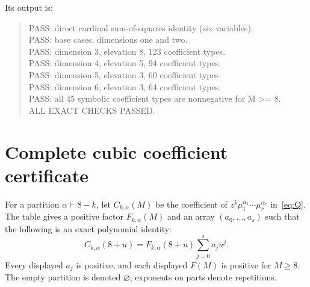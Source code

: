 \documentclass[11pt,a4paper]{article}
\theoremstyle{remark}
\begin{document}
Its output is:
\begin{quote}\ttfamily\small
PASS: direct cardinal sum-of-squares identity (six variables).\\
PASS: base cases, dimensions one and two.\\
PASS: dimension 3, elevation 8, 123 coefficient types.\\
PASS: dimension 4, elevation 5, 94 coefficient types.\\
PASS: dimension 5, elevation 3, 60 coefficient types.\\
PASS: dimension 6, elevation 3, 64 coefficient types.\\
PASS: all 45 symbolic coefficient types are nonnegative for M >= 8.\\
ALL EXACT CHECKS PASSED.
\end{quote}



\appendix
\section{Complete cubic coefficient certificate}\label{app:certificate}

For a partition $\alpha\vdash8-k$, let $C_{k,\alpha}(M)$ be the coefficient of $z^k\mu_1^{\alpha_1}\cdots\mu_r^{\alpha_r}$ in~\eqref{eq:Q}. The table gives a positive factor $F_{k,\alpha}(M)$ and an array $(a_0,\ldots,a_s)$ such that the following is an exact polynomial identity:
\begin{equation}\label{eq:tablemeaning}
 C_{k,\alpha}(8+u)=F_{k,\alpha}(8+u)\sum_{j=0}^s a_j u^j.
\end{equation}
Every displayed $a_j$ is positive, and each displayed $F(M)$ is positive for $M\ge8$. The empty partition is denoted $\varnothing$; exponents on parts denote repetitions.
\end{document}
